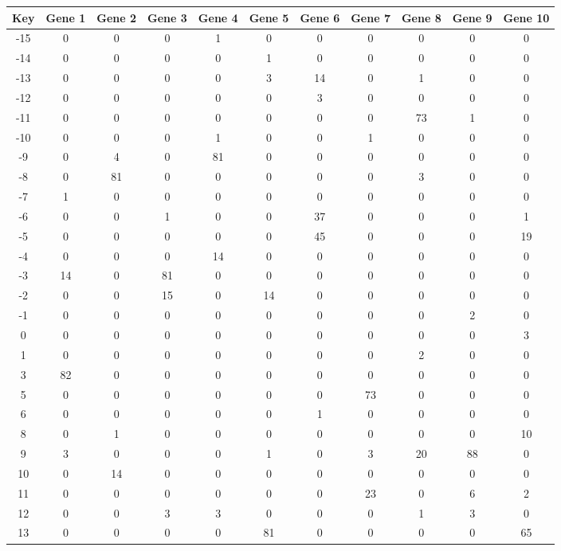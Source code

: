 \begin{tabular}{|c|c|c|c|c|c|c|c|c|c|c|}
\hline
Key & Gene 1 & Gene 2 & Gene 3 & Gene 4 & Gene 5 & Gene 6 & Gene 7 & Gene 8 & Gene 9 & Gene 10 \\
\hline
-15 & 0 & 0 & 0 & 1 & 0 & 0 & 0 & 0 & 0 & 0 \\
-14 & 0 & 0 & 0 & 0 & 1 & 0 & 0 & 0 & 0 & 0 \\
-13 & 0 & 0 & 0 & 0 & 3 & 14 & 0 & 1 & 0 & 0 \\
-12 & 0 & 0 & 0 & 0 & 0 & 3 & 0 & 0 & 0 & 0 \\
-11 & 0 & 0 & 0 & 0 & 0 & 0 & 0 & 73 & 1 & 0 \\
-10 & 0 & 0 & 0 & 1 & 0 & 0 & 1 & 0 & 0 & 0 \\
-9 & 0 & 4 & 0 & 81 & 0 & 0 & 0 & 0 & 0 & 0 \\
-8 & 0 & 81 & 0 & 0 & 0 & 0 & 0 & 3 & 0 & 0 \\
-7 & 1 & 0 & 0 & 0 & 0 & 0 & 0 & 0 & 0 & 0 \\
-6 & 0 & 0 & 1 & 0 & 0 & 37 & 0 & 0 & 0 & 1 \\
-5 & 0 & 0 & 0 & 0 & 0 & 45 & 0 & 0 & 0 & 19 \\
-4 & 0 & 0 & 0 & 14 & 0 & 0 & 0 & 0 & 0 & 0 \\
-3 & 14 & 0 & 81 & 0 & 0 & 0 & 0 & 0 & 0 & 0 \\
-2 & 0 & 0 & 15 & 0 & 14 & 0 & 0 & 0 & 0 & 0 \\
-1 & 0 & 0 & 0 & 0 & 0 & 0 & 0 & 0 & 2 & 0 \\
0 & 0 & 0 & 0 & 0 & 0 & 0 & 0 & 0 & 0 & 3 \\
1 & 0 & 0 & 0 & 0 & 0 & 0 & 0 & 2 & 0 & 0 \\
3 & 82 & 0 & 0 & 0 & 0 & 0 & 0 & 0 & 0 & 0 \\
5 & 0 & 0 & 0 & 0 & 0 & 0 & 73 & 0 & 0 & 0 \\
6 & 0 & 0 & 0 & 0 & 0 & 1 & 0 & 0 & 0 & 0 \\
8 & 0 & 1 & 0 & 0 & 0 & 0 & 0 & 0 & 0 & 10 \\
9 & 3 & 0 & 0 & 0 & 1 & 0 & 3 & 20 & 88 & 0 \\
10 & 0 & 14 & 0 & 0 & 0 & 0 & 0 & 0 & 0 & 0 \\
11 & 0 & 0 & 0 & 0 & 0 & 0 & 23 & 0 & 6 & 2 \\
12 & 0 & 0 & 3 & 3 & 0 & 0 & 0 & 1 & 3 & 0 \\
13 & 0 & 0 & 0 & 0 & 81 & 0 & 0 & 0 & 0 & 65 \\
\hline
\end{tabular}